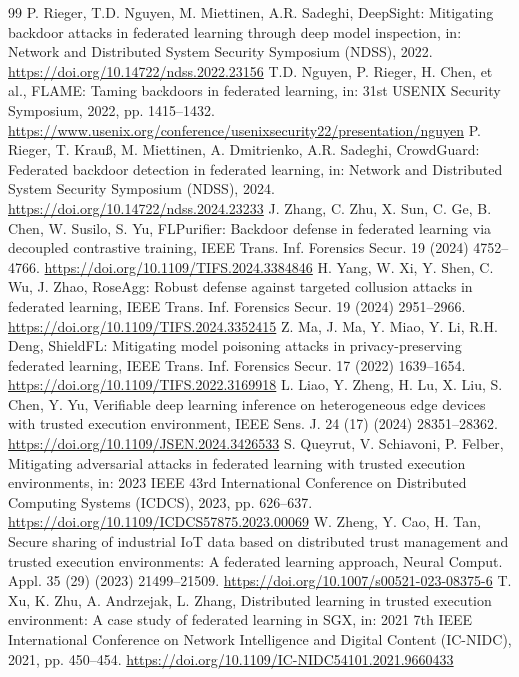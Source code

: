 \documentclass[final,5p,times,twocolumn]{elsarticle/elsarticle}
\begin{document}
\begin{thebibliography}{99}
     P. Rieger, T.D. Nguyen, M. Miettinen, A.R. Sadeghi, DeepSight: Mitigating backdoor attacks in federated learning through deep model inspection, in: Network and Distributed System Security Symposium (NDSS), 2022. \url{https://doi.org/10.14722/ndss.2022.23156}
     T.D. Nguyen, P. Rieger, H. Chen, et al., FLAME: Taming backdoors in federated learning, in: 31st USENIX Security Symposium, 2022, pp. 1415--1432. \url{https://www.usenix.org/conference/usenixsecurity22/presentation/nguyen}
     P. Rieger, T. Krau{\ss}, M. Miettinen, A. Dmitrienko, A.R. Sadeghi, CrowdGuard: Federated backdoor detection in federated learning, in: Network and Distributed System Security Symposium (NDSS), 2024. \url{https://doi.org/10.14722/ndss.2024.23233}
     J. Zhang, C. Zhu, X. Sun, C. Ge, B. Chen, W. Susilo, S. Yu, FLPurifier: Backdoor defense in federated learning via decoupled contrastive training, IEEE Trans. Inf. Forensics Secur. 19 (2024) 4752--4766. \url{https://doi.org/10.1109/TIFS.2024.3384846}
     H. Yang, W. Xi, Y. Shen, C. Wu, J. Zhao, RoseAgg: Robust defense against targeted collusion attacks in federated learning, IEEE Trans. Inf. Forensics Secur. 19 (2024) 2951--2966. \url{https://doi.org/10.1109/TIFS.2024.3352415}
     Z. Ma, J. Ma, Y. Miao, Y. Li, R.H. Deng, ShieldFL: Mitigating model poisoning attacks in privacy-preserving federated learning, IEEE Trans. Inf. Forensics Secur. 17 (2022) 1639--1654. \url{https://doi.org/10.1109/TIFS.2022.3169918}
     L. Liao, Y. Zheng, H. Lu, X. Liu, S. Chen, Y. Yu, Verifiable deep learning inference on heterogeneous edge devices with trusted execution environment, IEEE Sens. J. 24 (17) (2024) 28351--28362. \url{https://doi.org/10.1109/JSEN.2024.3426533}
     S. Queyrut, V. Schiavoni, P. Felber, Mitigating adversarial attacks in federated learning with trusted execution environments, in: 2023 IEEE 43rd International Conference on Distributed Computing Systems (ICDCS), 2023, pp. 626--637. \url{https://doi.org/10.1109/ICDCS57875.2023.00069}
     W. Zheng, Y. Cao, H. Tan, Secure sharing of industrial IoT data based on distributed trust management and trusted execution environments: A federated learning approach, Neural Comput. Appl. 35 (29) (2023) 21499--21509. \url{https://doi.org/10.1007/s00521-023-08375-6}
     T. Xu, K. Zhu, A. Andrzejak, L. Zhang, Distributed learning in trusted execution environment: A case study of federated learning in SGX, in: 2021 7th IEEE International Conference on Network Intelligence and Digital Content (IC-NIDC), 2021, pp. 450--454. \url{https://doi.org/10.1109/IC-NIDC54101.2021.9660433}

\end{thebibliography}
\end{document}
